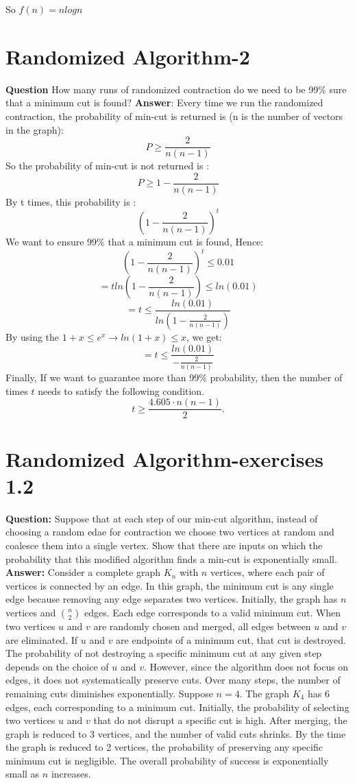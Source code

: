 \documentclass[12pt]{article}
\begin{document}
So $f(n)= nlogn$
\section{Randomized Algorithm-2}
\textbf{Question}
How many runs of randomized contraction do we need to be 99\% sure that a minimum cut is found?
\textbf{Answer}:
Every time we run the randomized contraction, the probability of min-cut is returned is (n is the number of vectors in the graph):
\[P\geq\frac{2}{n(n-1)}\]
So the probability of min-cut is not returned is :
\[P\geq1-\frac{2}{n(n-1)}\]
By t times, this probability is :
\[(1-\frac{2}{n(n-1)})^t\]
We want to ensure 99\% that a minimum cut is found, Hence:
\[(1-\frac{2}{n(n-1)})^t\leq0.01\]
\[=tln(1-\frac{2}{n(n-1)})\leq ln(0.01)\]
\[=t\leq \frac{ln(0.01)}{ln(1-\frac{2}{n(n-1)})}\]
By using the \(1+x\leq e^x \rightarrow ln(1+x)\leq x\), we get:
\[=t\leq \frac{ln(0.01)}{-\frac{2}{n(n-1)}}\]
Finally, If we want to guarantee more than 99\% probability, then the number of times \(t\) needs to satisfy the following condition.
\[
t \geq \frac{4.605 \cdot n(n - 1)}{2}.
\]


\section{Randomized Algorithm-exercises 1.2}
\textbf{Question:}
Suppose that at each step of our min-cut algorithm, instead of choosing a random edae for contraction we choose two vertices at random and coalesce them into a single vertex. Show that there are inputs on which the probability that this modified algorithm finds a min-cut is exponentially small.\\
\textbf{Answer:}
Consider a complete graph \( K_n \) with \( n \) vertices, where each pair of vertices is connected by an edge. In this graph, the minimum cut is any single edge because removing any edge separates two vertices. Initially, the graph has \( n \) vertices and \( \binom{n}{2} \) edges. Each edge corresponds to a valid minimum cut. When two vertices \( u \) and \( v \) are randomly chosen and merged, all edges between \( u \) and \( v \) are eliminated. If \( u \) and \( v \) are endpoints of a minimum cut, that cut is destroyed. The probability of not destroying a specific minimum cut at any given step depends on the choice of \( u \) and \( v \). However, since the algorithm does not focus on edges, it does not systematically preserve cuts. Over many steps, the number of remaining cuts diminishes exponentially. Suppose \( n = 4 \). The graph \( K_4 \) has 6 edges, each corresponding to a minimum cut. Initially, the probability of selecting two vertices \( u \) and \( v \) that do not disrupt a specific cut is high. After merging, the graph is reduced to 3 vertices, and the number of valid cuts shrinks. By the time the graph is reduced to 2 vertices, the probability of preserving any specific minimum cut is negligible. The overall probability of success is exponentially small as \( n \) increases.
\end{document}
